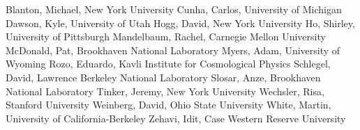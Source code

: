 Blanton, Michael, New York University \newline
Cunha, Carlos, University of Michigan \newline
Dawson, Kyle, University of Utah \newline
Hogg, David, New York University \newline
Ho, Shirley, University of Pittsburgh \newline
Mandelbaum, Rachel,  Carnegie Mellon University \newline
McDonald, Pat, Brookhaven National Laboratory \newline
Myers, Adam, University of Wyoming \newline
Rozo, Eduardo, Kavli Institute for Cosmological Physics \newline
Schlegel, David, Lawrence Berkeley National Laboratory \newline
Slosar, Anze, Brookhaven National Laboratory \newline
Tinker, Jeremy, New York University \newline
Wechsler, Risa, Stanford University \newline
Weinberg, David, Ohio State University \newline
White, Martin, University of California-Berkeley \newline
Zehavi, Idit, Case Western Reserve University \newline
